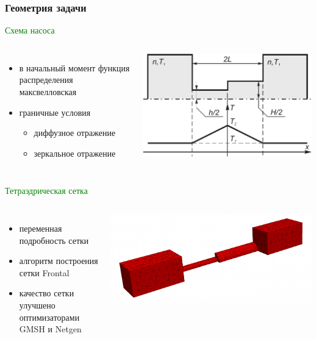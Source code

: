 \documentclass[ucs]{beamer}
\begin{document}
\begin{frame}
	\frametitle{Геометрия задачи}
	\textcolor{green}{Схема насоса} 
	\begin{columns}[c]
	\column{0.55\paperwidth}
	\begin{itemize}
	\item в начальный момент функция распределения максвелловская
	\item граничные условия
	\begin{itemize}
	\item диффузное отражение
	\item зеркальное отражение
	\end{itemize}
	\end{itemize}
	\column{0.4\paperwidth}
		\includegraphics[width=\columnwidth]{pump_scheme.pdf}
	\end{columns}
	\textcolor{green}{Тетраэдрическая сетка} 
	\begin{columns}[c]
	\column{0.55\paperwidth}
	\begin{itemize}
		\item переменная подробность сетки
		\item алгоритм построения сетки Frontal
		\item качество сетки улучшено оптимизаторами GMSH и Netgen
	\end{itemize}
	\column{0.4\paperwidth}
		\includegraphics[width=\columnwidth]{Mesh}
	\end{columns}
\end{frame}
\end{document}
